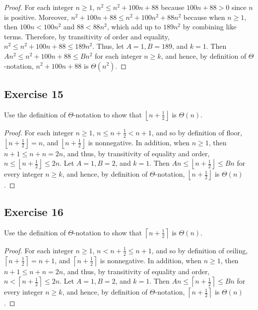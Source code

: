 \documentclass[14pt]{extarticle}
\newcommand{\dps}{\displaystyle}
\newcommand{\floor}[1]{{\left\lfloor#1\right\rfloor}}
\newcommand{\ceil}[1]{{\left\lceil#1\right\rceil}}
\begin{document}
\begin{proof}
For each integer \(n \geq 1\), \(n^2 \leq n^2 + 100n + 88\) because \(100n + 88 > 0\) since \(n\) is positive. Moreover, 
\(n^2 + 100n + 88 \leq n^2 + 100n^2 + 88n^2\) because when \(n \geq 1\), then \(100n < 100n^2\) and \(88 < 88n^2\), which add 
up to \(189n^2\) by combining like terms. Therefore, by transitivity of order and equality, \(n^2 \leq n^2 + 100n + 88 \leq 189n^2\). Thus, let \(A = 1, B = 189\), and \(k = 1\). Then \(An^2 \leq n^2 + 100n + 88 \leq Bn^2\) for each integer 
\(n \geq k\), and hence, by definition of \(\Theta\)-notation, \(n^2 + 100n + 88\) is \(\Theta(n^2)\).
\end{proof}

\subsection{Exercise 15}
Use the definition of \(\Theta\)-notation to show that \(\dps \floor{n + \frac{1}{2}}\) is \(\Theta(n)\).

\begin{proof}
For each integer \(n \geq 1\), \(\dps n \leq n + \frac{1}{2} < n+1\), and so by definition of floor, \(\dps \floor{n + 
\frac{1}{2}} = n\), and \(\dps \floor{n + \frac{1}{2}}\) is nonnegative. In addition, when \(n \geq 1\), then \(n + 1 \leq 
n + n = 2n\), and thus, by transitivity of equality and order, \(\dps n \leq \floor{n + \frac{1}{2}} \leq 2n\).
Let \(A = 1, B = 2\), and \(k = 1\). Then \(\dps An\leq \floor {n+\frac{1}{2}}\leq Bn\) for every integer \(n \geq k\),
and hence, by definition of \(\Theta\)-notation, \(\dps \floor {n+\frac{1}{2}}\) is \(\Theta(n)\).
\end{proof}

\subsection{Exercise 16}
Use the definition of \(\Theta\)-notation to show that \(\dps \ceil{n + \frac{1}{2}}\) is \(\Theta(n)\).

\begin{proof}
For each integer \(n \geq 1\), \(\dps n < n + \frac{1}{2} \leq n+1\), and so by definition of ceiling, \(\dps \ceil{n + 
\frac{1}{2}} = n+1\), and \(\dps \ceil{n + \frac{1}{2}}\) is nonnegative. In addition, when \(n \geq 1\), then \(n + 1 \leq 
n + n = 2n\), and thus, by transitivity of equality and order, \(\dps n < \ceil{n + \frac{1}{2}} \leq 2n\).
Let \(A = 1, B = 2\), and \(k = 1\). Then \(\dps An\leq \ceil{n+\frac{1}{2}}\leq Bn\) for every integer \(n \geq k\),
and hence, by definition of \(\Theta\)-notation, \(\dps \ceil {n+\frac{1}{2}}\) is \(\Theta(n)\).
\end{proof}
\end{document}
